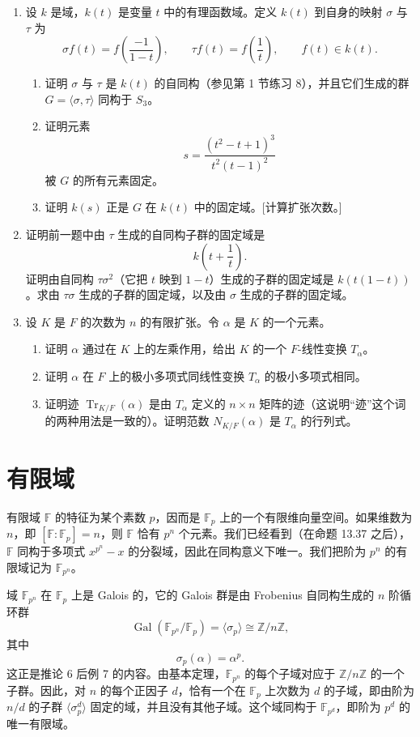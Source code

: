 \begin{enumerate}[label=\arabic*.]
\item 设 $k$ 是域，$k(t)$ 是变量 $t$ 中的有理函数域。定义 $k(t)$ 到自身的映射 $\sigma$ 与 $\tau$ 为
\[
\sigma f(t)=f\left(\frac{-1}{1-t}\right),
\qquad
\tau f(t)=f\left(\frac1t\right),
\qquad f(t)\in k(t).
\]
\begin{enumerate}[label=(\alph*)]
\item 证明 $\sigma$ 与 $\tau$ 是 $k(t)$ 的自同构（参见第 1 节练习 8），并且它们生成的群 $G=\langle\sigma,\tau\rangle$ 同构于 $S_3$。
\item 证明元素
\[
s=\frac{(t^2-t+1)^3}{t^2(t-1)^2}
\]
被 $G$ 的所有元素固定。
\item 证明 $k(s)$ 正是 $G$ 在 $k(t)$ 中的固定域。[计算扩张次数。]
\end{enumerate}

\item 证明前一题中由 $\tau$ 生成的自同构子群的固定域是
\[
k\left(t+\frac1t\right).
\]
证明由自同构 $\tau\sigma^2$（它把 $t$ 映到 $1-t$）生成的子群的固定域是 $k(t(1-t))$。求由 $\tau\sigma$ 生成的子群的固定域，以及由 $\sigma$ 生成的子群的固定域。

\item 设 $K$ 是 $F$ 的次数为 $n$ 的有限扩张。令 $\alpha$ 是 $K$ 的一个元素。
\begin{enumerate}[label=(\alph*)]
\item 证明 $\alpha$ 通过在 $K$ 上的左乘作用，给出 $K$ 的一个 $F$-线性变换 $T_\alpha$。
\item 证明 $\alpha$ 在 $F$ 上的极小多项式同线性变换 $T_\alpha$ 的极小多项式相同。
\item 证明迹 $\operatorname{Tr}_{K/F}(\alpha)$ 是由 $T_\alpha$ 定义的 $n\times n$ 矩阵的迹（这说明“迹”这个词的两种用法是一致的）。证明范数 $N_{K/F}(\alpha)$ 是 $T_\alpha$ 的行列式。
\end{enumerate}
\end{enumerate}

\section{有限域}

有限域 $\mathbb F$ 的特征为某个素数 $p$，因而是 $\mathbb F_p$ 上的一个有限维向量空间。如果维数为 $n$，即 $[\mathbb F:\mathbb F_p]=n$，则 $\mathbb F$ 恰有 $p^n$ 个元素。我们已经看到（在命题 13.37 之后），$\mathbb F$ 同构于多项式 $x^{p^n}-x$ 的分裂域，因此在同构意义下唯一。我们把阶为 $p^n$ 的有限域记为 $\mathbb F_{p^n}$。

域 $\mathbb F_{p^n}$ 在 $\mathbb F_p$ 上是 Galois 的，它的 Galois 群是由 Frobenius 自同构生成的 $n$ 阶循环群
\[
\operatorname{Gal}(\mathbb F_{p^n}/\mathbb F_p)=\langle \sigma_p\rangle\cong \mathbb Z/n\mathbb Z,
\]
其中
\[
\sigma_p(\alpha)=\alpha^p.
\]
这正是推论 6 后例 7 的内容。由基本定理，$\mathbb F_{p^n}$ 的每个子域对应于 $\mathbb Z/n\mathbb Z$ 的一个子群。因此，对 $n$ 的每个正因子 $d$，恰有一个在 $\mathbb F_p$ 上次数为 $d$ 的子域，即由阶为 $n/d$ 的子群 $\langle \sigma_p^d\rangle$ 固定的域，并且没有其他子域。这个域同构于 $\mathbb F_{p^d}$，即阶为 $p^d$ 的唯一有限域。

